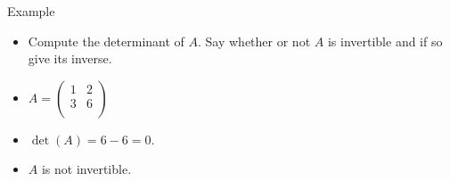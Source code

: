 \documentclass{beamer}
\begin{document}
\begin{frame}{Example}

\begin{itemize}
\item Compute the determinant of $A$. Say whether or not $A$ is invertible
and if so give its inverse.
\item
$
A =
\begin{pmatrix}
1 & 2 \\
3 & 6 \\
\end{pmatrix}
$
\item $\det(A) = 6 - 6 = 0$.
\item $A$ is not invertible.
\end{itemize}
\end{frame}



\end{document}
